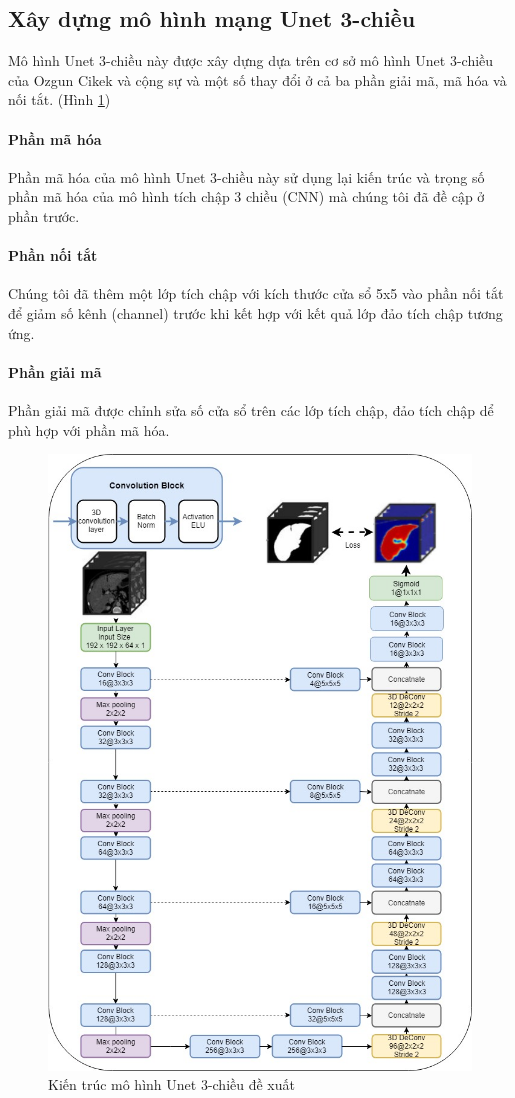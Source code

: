 \subsection{Xây dựng mô hình mạng Unet 3-chiều}
Mô hình Unet 3-chiều này được xây dựng dựa trên cơ sở mô hình Unet 3-chiều \cite{3DUnet} của Ozgun Cikek và cộng sự và một số thay đổi ở cả ba phần giải mã, mã hóa và nối tắt. (Hình \ref{Unet3D_pro})
\paragraph{Phần mã hóa} Phần mã hóa của mô hình Unet 3-chiều này sử dụng lại kiến trúc và trọng số phần mã hóa của mô hình tích chập 3 chiều (CNN) mà chúng tôi đã đề cập ở phần trước.
\paragraph{Phần nối tắt} Chúng tôi đã thêm một lớp tích chập với kích thước cửa sổ 5x5 vào phần nối tắt để giảm số kênh (channel) trước khi kết hợp với kết quả lớp đảo tích chập tương ứng.
\paragraph{Phần giải mã} Phần giải mã được chỉnh sửa số cửa sổ trên các lớp tích chập, đảo tích chập dể phù hợp với phần mã hóa.
\begin{figure}[h]
\centering
    \includegraphics[totalheight=23cm]{Images/UNET3D_pro.jpg}
    \caption{Kiến trúc mô hình Unet 3-chiều đề xuất}
    \label{Unet3D_pro}
\end{figure}
